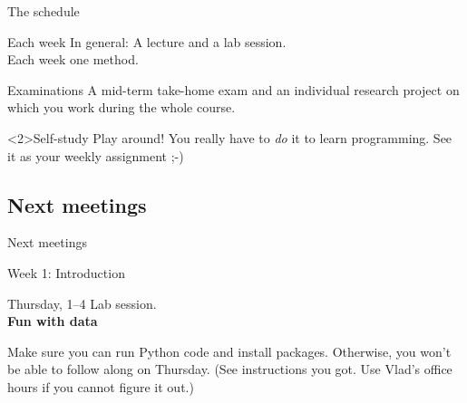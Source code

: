 \documentclass[handout]{beamer}
\begin{document}
\begin{frame}{The schedule}
	\begin{block}{Each week}
		In general: A lecture and a lab session. \\ Each week one method.
	\end{block}
	\begin{block}{Examinations}
		A mid-term take-home exam and an individual research project on which you work during the whole course.
	\end{block}
	
	
	\begin{alertblock}{Self-study}
		Play around! You really have to \emph{do} it to learn programming. See it as your weekly assignment ;-)
	\end{alertblock}
\end{frame}




\subsection{Next meetings}
\begin{frame}
	Next meetings
\end{frame}


\begin{frame}{Week 1: Introduction}
	
	\begin{block}{Thursday, 1--4}
		Lab session.\\
		\textbf{Fun with data}
		\end{block}
\end{frame}

\begin{frame}[standout]
	Make sure you can run Python code and install packages. Otherwise, you won't be able to follow along on Thursday. (See instructions you got. Use Vlad's office hours if you cannot figure it out.)
\end{frame}


\begin{frame}[plain]
    \printbibliography
\end{frame}
\end{document}
